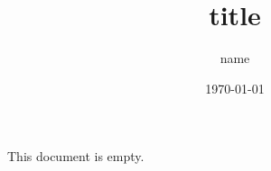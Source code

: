 \documentclass[a4paper,12pt]{ltjsarticle}
\title{title}
\author{name}
\date{\today}
\begin{document}
  This document is empty. 
\end{document}
